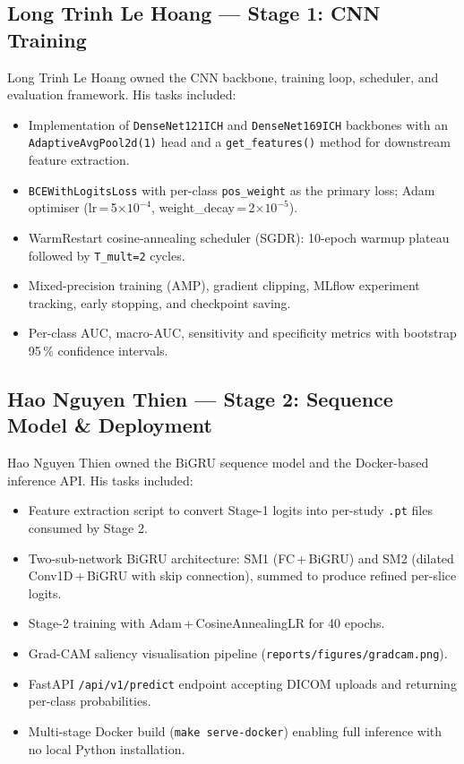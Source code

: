 \subsection*{Long Trinh Le Hoang — Stage 1: CNN Training}

Long Trinh Le Hoang owned the CNN backbone, training loop, scheduler,
and evaluation framework. His tasks included:
\begin{itemize}
    \item Implementation of \texttt{DenseNet121ICH} and
          \texttt{DenseNet169ICH} backbones with an
          \texttt{AdaptiveAvgPool2d(1)} head and a \texttt{get\_features()}
          method for downstream feature extraction.
    \item \texttt{BCEWithLogitsLoss} with per-class \texttt{pos\_weight}
          as the primary loss; Adam optimiser
          (lr\,=\,5$\times 10^{-4}$, weight\_decay\,=\,2$\times 10^{-5}$).
    \item WarmRestart cosine-annealing scheduler (SGDR):
          10-epoch warmup plateau followed by \texttt{T\_mult=2} cycles.
    \item Mixed-precision training (AMP), gradient clipping, MLflow
          experiment tracking, early stopping, and checkpoint saving.
    \item Per-class AUC, macro-AUC, sensitivity and specificity metrics
          with bootstrap 95\,\% confidence intervals.
\end{itemize}

\subsection*{Hao Nguyen Thien — Stage 2: Sequence Model \& Deployment}

Hao Nguyen Thien owned the BiGRU sequence model and the Docker-based
inference API. His tasks included:
\begin{itemize}
    \item Feature extraction script to convert Stage-1 logits into
          per-study \texttt{.pt} files consumed by Stage 2.
    \item Two-sub-network BiGRU architecture: SM1 (FC\,+\,BiGRU) and
          SM2 (dilated Conv1D\,+\,BiGRU with skip connection), summed
          to produce refined per-slice logits.
    \item Stage-2 training with Adam\,+\,CosineAnnealingLR for 40 epochs.
    \item Grad-CAM saliency visualisation pipeline
          (\texttt{reports/figures/gradcam.png}).
    \item FastAPI \texttt{/api/v1/predict} endpoint accepting DICOM
          uploads and returning per-class probabilities.
    \item Multi-stage Docker build (\texttt{make serve-docker}) enabling
          full inference with no local Python installation.
\end{itemize}
